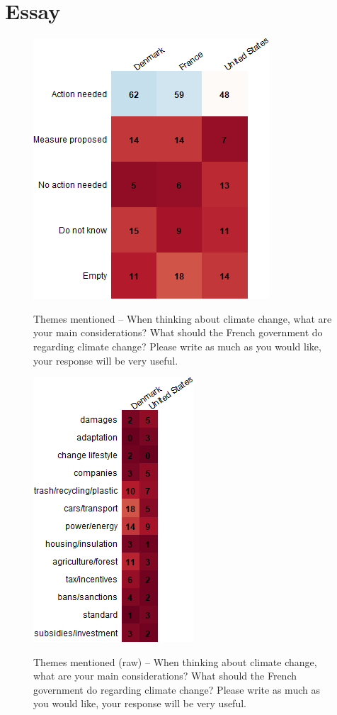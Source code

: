 \documentclass[aspectratio=169,9pt,dvipsnames]{beamer}
\begin{document}
\section{Essay}


\begin{frame}{}%
\begin{figure}[h!]
\centering
\caption{Themes mentioned -- When thinking about climate change, what are your main considerations? What should the French government do regarding climate change?
Please write as much as you would like, your response will be very useful.}
\includegraphics[width=.35\textwidth]{../figures/country_comparison/CC_field_mentions_positive_countries.png} \\
\end{figure}
\end{frame}

\begin{frame}{}%
\begin{figure}[h!]
\centering
\caption{Themes mentioned (raw) -- When thinking about climate change, what are your main considerations? What should the French government do regarding climate change?
Please write as much as you would like, your response will be very useful.}
\includegraphics[width=.3\textwidth]{../figures/country_comparison/CC_field_mentions_raw_positive_countries.png} \\
\end{figure}
\end{frame}
\end{document}
